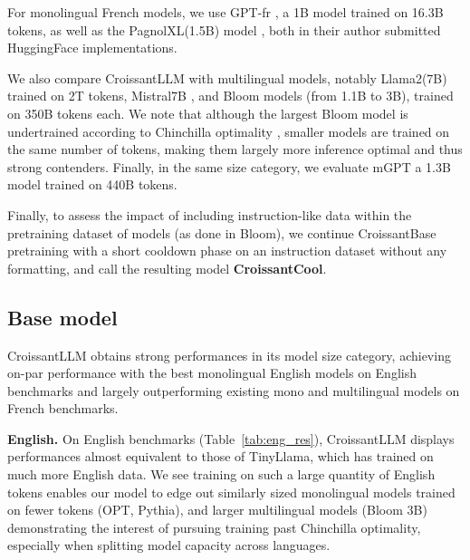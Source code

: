 For monolingual French models, we use GPT-fr , a 1B model trained on 16.3B tokens, as well as the PagnolXL(1.5B) model  , both in their author submitted HuggingFace implementations.

We also compare CroissantLLM with multilingual models, notably Llama2(7B) \cite{touvron_llama_2023} trained on 2T tokens, Mistral7B \cite{jiang_mistral_2023}, and Bloom \cite{scao2022bloom} models (from 1.1B to 3B), trained on 350B tokens each. We note that although the largest Bloom model is undertrained according to Chinchilla optimality \cite{hoffmann2022training}, smaller models are trained on the same number of tokens, making them largely more inference optimal and thus strong contenders. Finally, in the same size category, we evaluate mGPT  a 1.3B model trained on 440B tokens.

Finally, to assess the impact of including instruction-like data within the pretraining dataset of models (as done in Bloom), we continue CroissantBase pretraining with a short cooldown phase on an instruction dataset without any formatting, and call the resulting model \textbf{CroissantCool}. 


\subsection{Base model}


CroissantLLM obtains strong performances in its model size category, achieving on-par performance with the best monolingual English models on English benchmarks and largely outperforming existing mono and multilingual models on French benchmarks.


\textbf{English.}
On English benchmarks  (Table~\ref{tab:eng_res}), CroissantLLM displays performances almost equivalent to those of TinyLlama, which has trained on much more English data. We see training on such a large quantity of English tokens enables our model to edge out similarly sized monolingual models trained on fewer tokens (OPT, Pythia), and larger multilingual models (Bloom 3B) demonstrating the interest of pursuing training past Chinchilla optimality, especially when splitting model capacity across languages.



